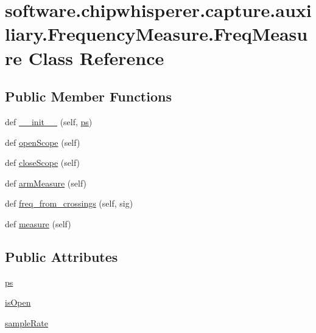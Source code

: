 \hypertarget{classsoftware_1_1chipwhisperer_1_1capture_1_1auxiliary_1_1FrequencyMeasure_1_1FreqMeasure}{}\section{software.\+chipwhisperer.\+capture.\+auxiliary.\+Frequency\+Measure.\+Freq\+Measure Class Reference}
\label{classsoftware_1_1chipwhisperer_1_1capture_1_1auxiliary_1_1FrequencyMeasure_1_1FreqMeasure}
\subsection*{Public Member Functions}
\begin{DoxyCompactItemize}
\item 
def \hyperlink{classsoftware_1_1chipwhisperer_1_1capture_1_1auxiliary_1_1FrequencyMeasure_1_1FreqMeasure_af74533682800dc8bba7bfc4560c835dc}{\+\_\+\+\_\+init\+\_\+\+\_\+} (self, \hyperlink{classsoftware_1_1chipwhisperer_1_1capture_1_1auxiliary_1_1FrequencyMeasure_1_1FreqMeasure_af2545458d3c342049086990489f391a5}{ps})
\item 
def \hyperlink{classsoftware_1_1chipwhisperer_1_1capture_1_1auxiliary_1_1FrequencyMeasure_1_1FreqMeasure_afbc6e2b4b5dc1c8e377b9c61f9003ad5}{open\+Scope} (self)
\item 
def \hyperlink{classsoftware_1_1chipwhisperer_1_1capture_1_1auxiliary_1_1FrequencyMeasure_1_1FreqMeasure_a05165f01df1e2c3bec3e72362700597f}{close\+Scope} (self)
\item 
def \hyperlink{classsoftware_1_1chipwhisperer_1_1capture_1_1auxiliary_1_1FrequencyMeasure_1_1FreqMeasure_a967c62573202adf5e148ee2cbfcbe7fd}{arm\+Measure} (self)
\item 
def \hyperlink{classsoftware_1_1chipwhisperer_1_1capture_1_1auxiliary_1_1FrequencyMeasure_1_1FreqMeasure_ac40f8e10bfb7566630a8f10a6b2080e3}{freq\+\_\+from\+\_\+crossings} (self, sig)
\item 
def \hyperlink{classsoftware_1_1chipwhisperer_1_1capture_1_1auxiliary_1_1FrequencyMeasure_1_1FreqMeasure_a884ed5f6cd0388de0d2dd352fb2d2cc6}{measure} (self)
\end{DoxyCompactItemize}
\subsection*{Public Attributes}
\begin{DoxyCompactItemize}
\item 
\hyperlink{classsoftware_1_1chipwhisperer_1_1capture_1_1auxiliary_1_1FrequencyMeasure_1_1FreqMeasure_af2545458d3c342049086990489f391a5}{ps}
\item 
\hyperlink{classsoftware_1_1chipwhisperer_1_1capture_1_1auxiliary_1_1FrequencyMeasure_1_1FreqMeasure_a2ae0bc89daf835da875430d3bb9a7f96}{is\+Open}
\item 
\hyperlink{classsoftware_1_1chipwhisperer_1_1capture_1_1auxiliary_1_1FrequencyMeasure_1_1FreqMeasure_aa20585486d90250dd2d231f6e9c478ed}{sample\+Rate}
\end{DoxyCompactItemize}


